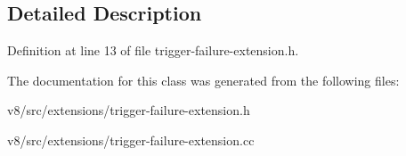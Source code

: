 \subsection{Detailed Description}


Definition at line 13 of file trigger-\/failure-\/extension.\+h.



The documentation for this class was generated from the following files\+:\begin{DoxyCompactItemize}
\item 
v8/src/extensions/trigger-\/failure-\/extension.\+h\item 
v8/src/extensions/trigger-\/failure-\/extension.\+cc\end{DoxyCompactItemize}
